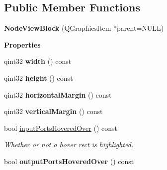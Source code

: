 \subsection*{Public Member Functions}
\begin{DoxyCompactItemize}
\item 
\mbox{\label{classrev_1_1_view_1_1_node_view_block_ae9febdc371a8ba3b363dedec85a83fff}} 
{\bfseries Node\+View\+Block} (Q\+Graphics\+Item $\ast$parent=N\+U\+LL)
\end{DoxyCompactItemize}
\begin{Indent}\textbf{ Properties}\par
\begin{DoxyCompactItemize}
\item 
\mbox{\label{classrev_1_1_view_1_1_node_view_block_a599f838ead32d6f8e94da605d2185617}} 
qint32 {\bfseries width} () const
\item 
\mbox{\label{classrev_1_1_view_1_1_node_view_block_a94cd36d37459c3fa359e6a538d803629}} 
qint32 {\bfseries height} () const
\item 
\mbox{\label{classrev_1_1_view_1_1_node_view_block_a3ab684a79589b316dc4ab03a8b6a0476}} 
qint32 {\bfseries horizontal\+Margin} () const
\item 
\mbox{\label{classrev_1_1_view_1_1_node_view_block_a081ba7cd620828a09b5e240a92fe9055}} 
qint32 {\bfseries vertical\+Margin} () const
\item 
\mbox{\label{classrev_1_1_view_1_1_node_view_block_a0c3ee10abb23802a44eb260ed21d03fa}} 
bool \mbox{\hyperlink{classrev_1_1_view_1_1_node_view_block_a0c3ee10abb23802a44eb260ed21d03fa}{input\+Ports\+Hovered\+Over}} () const
\begin{DoxyCompactList}\small\item\em Whether or not a hover rect is highlighted. \end{DoxyCompactList}\item 
\mbox{\label{classrev_1_1_view_1_1_node_view_block_a958132b91ab4fb9fe2f1780615b5aceb}} 
bool {\bfseries output\+Ports\+Hovered\+Over} () const
\end{DoxyCompactItemize}
\end{Indent}
